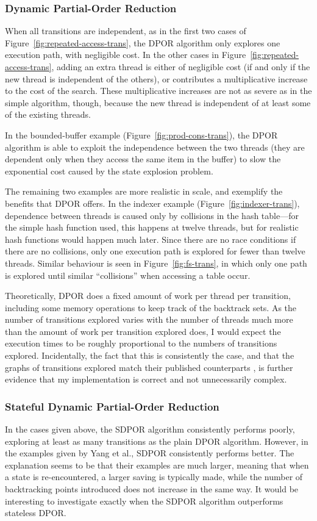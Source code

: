 \documentclass[12pt,a4paper,twoside,openright]{report}
\begin{document}
\subsubsection{Dynamic Partial-Order Reduction}
When all transitions are independent,
as in the first two cases of
Figure~\ref{fig:repeated-access-trans},
the DPOR algorithm only explores
one execution path, with negligible cost.
In the other cases in
Figure~\ref{fig:repeated-access-trans},
adding an extra thread is either of
negligible cost (if and only if the new thread
is independent of the others), or
contributes a multiplicative
increase to the cost of the search.
These multiplicative increases are
not as severe as in the
simple algorithm, though, because the new
thread is independent of at least some of
the existing threads.

In the bounded-buffer example
(Figure~\ref{fig:prod-cons-trans}),
the DPOR algorithm is able to exploit
the independence between the two threads
(they are dependent only when they
access the same item in the buffer) to
slow the
exponential cost caused by the
state explosion problem.

The remaining two examples are more
realistic in scale, and exemplify the
benefits that DPOR offers.
In the indexer example
(Figure~\ref{fig:indexer-trans}),
dependence between
threads is caused only by collisions
in the hash table---for the simple
hash function used, this happens at twelve threads,
but for realistic hash functions would
happen much later. Since there are no
race conditions if there are no collisions,
only one execution path
is explored for fewer than twelve threads.
Similar behaviour is seen in
Figure~\ref{fig:fs-trans}, in which only
one path is explored until similar ``collisions''
when accessing a table occur.

Theoretically, DPOR does a fixed amount of
work per thread per transition, including some
memory operations to keep track of the backtrack
sets. As the number of transitions explored
varies with
the number of threads much more than the amount
of work per transition explored does, I would
expect the execution times to be roughly
proportional to the numbers of transitions
explored. Incidentally, the fact that this is consistently
the case, and that the graphs of transitions
explored match their published counterparts
\cite{flan05},
is further evidence that my
implementation is correct and not
unnecessarily complex.

\subsubsection{Stateful Dynamic Partial-Order Reduction}
In the cases given above, the SDPOR algorithm
consistently performs poorly, exploring at
least as many transitions as the plain
DPOR algorithm. However, in the examples
given by Yang et al.\@ \cite{yang08},
SDPOR consistently performs better.
The explanation seems to be that
their examples are much larger, meaning
that when a state is re-encountered,
a larger saving is typically made,
while the number of backtracking
points introduced does not increase
in the same way. It would be interesting
to investigate exactly when the SDPOR
algorithm outperforms stateless DPOR.
\end{document}
